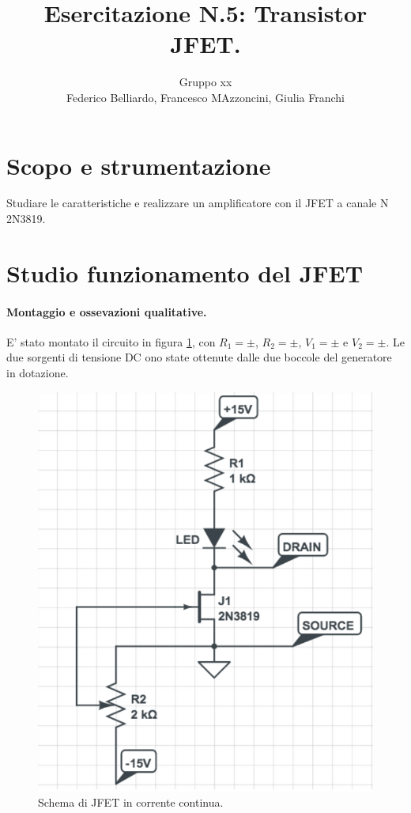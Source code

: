 \documentclass[10pt,a4paper]{article}
\author{Gruppo xx \\ Federico Belliardo, Francesco MAzzoncini, Giulia Franchi}
\title{Esercitazione N.5: Transistor JFET.}
\begin{document}
\maketitle

\section{Scopo e strumentazione}
Studiare le caratteristiche e realizzare un amplificatore con il JFET a canale N 2N3819.


\section{Studio funzionamento del JFET}
\paragraph{Montaggio e ossevazioni qualitative.}
E' stato montato il circuito in figura \ref{circuito1}, con  $R_1 = \pm$, $R_2 = \pm$, $V_1 = \pm $ e $V_2 = \pm$. Le due sorgenti di tensione DC ono state ottenute dalle due boccole del generatore in dotazione.

\begin{figure}
\centering
\includegraphics[scale=0.4]{circuito1.png}
\caption{Schema di JFET in corrente continua.\label{circuito1}}
\end{figure}
\end{document}
